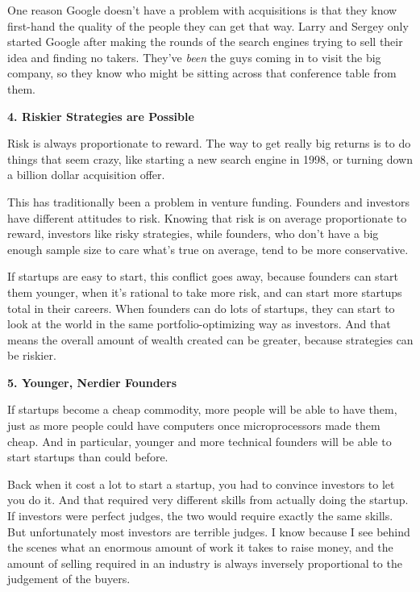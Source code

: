 One reason
                    Google doesn't have a problem with acquisitions is that they
                    know first-hand the quality of the people they can get that
                    way. Larry and Sergey only started Google after making the
                    rounds of the search engines trying to sell their idea and
                    finding no takers. They've \emph{been} the guys coming in to
                    visit the big company, so they know who might be sitting
                    across that conference table from them.

\textbf{4. Riskier Strategies are Possible}

Risk is always proportionate to reward. The way
                    to get really big returns is to do things that seem crazy,
                    like starting a new search engine in 1998, or turning down a
                    billion dollar acquisition offer.

This has
                    traditionally been a problem in venture funding. Founders
                    and investors have different attitudes to risk. Knowing that
                    risk is on average proportionate to reward, investors like
                    risky strategies, while founders, who don't have a big
                    enough sample size to care what's true on average, tend to
                    be more conservative.

If startups are easy to
                    start, this conflict goes away, because founders can start
                    them younger, when it's rational to take more risk, and can
                    start more startups total in their careers. When founders
                    can do lots of startups, they can start to look at the world
                    in the same portfolio-optimizing way as investors. And that
                    means the overall amount of wealth created can be greater,
                    because strategies can be riskier.

\textbf{5. Younger, Nerdier Founders}

If startups become a cheap commodity, more
                    people will be able to have them, just as more people could
                    have computers once microprocessors made them cheap. And in
                    particular, younger and more technical founders will be able
                    to start startups than could before.

Back when it
                    cost a lot to start a startup, you had to convince investors
                    to let you do it. And that required very different skills
                    from actually doing the startup. If investors were perfect
                    judges, the two would require exactly the same skills. But
                    unfortunately most investors are terrible judges. I know
                    because I see behind the scenes what an enormous amount of
                    work it takes to raise money, and the amount of selling
                    required in an industry is always inversely proportional to
                    the judgement of the buyers.

